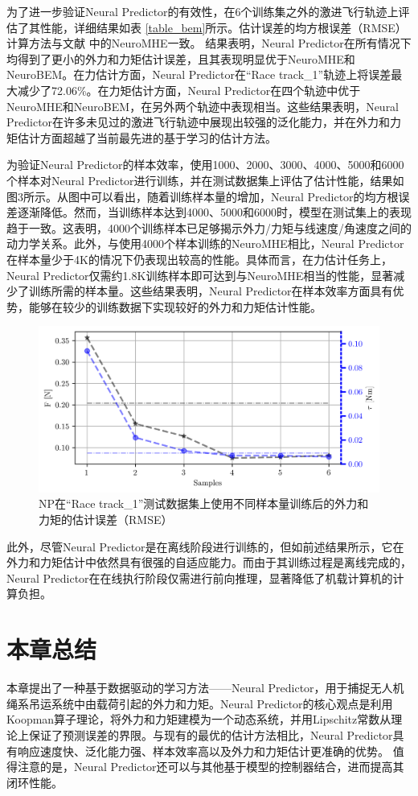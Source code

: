 \documentclass[lang=chs, degree=master, blindreview=true, winfonts=true]{yanputhesis}
\begin{document}
为了进一步验证Neural Predictor的有效性，在6个训练集之外的激进飞行轨迹上评估了其性能，详细结果如表 \ref{table_bem}所示。估计误差的均方根误差（RMSE）计算方法与文献 \cite{Wang2024e} 中的NeuroMHE一致。
结果表明，Neural Predictor在所有情况下均得到了更小的外力和力矩估计误差，且其表现明显优于NeuroMHE和NeuroBEM。在力估计方面，Neural Predictor在“Race track\_1”轨迹上将误差最大减少了72.06\%。在力矩估计方面，Neural Predictor在四个轨迹中优于NeuroMHE和NeuroBEM，在另外两个轨迹中表现相当。这些结果表明，Neural Predictor在许多未见过的激进飞行轨迹中展现出较强的泛化能力，并在外力和力矩估计方面超越了当前最先进的基于学习的估计方法。

为验证Neural Predictor的样本效率，使用1000、2000、3000、4000、5000和6000个样本对Neural Predictor进行训练，并在测试数据集上评估了估计性能，结果如图3所示。从图中可以看出，随着训练样本量的增加，Neural Predictor的均方根误差逐渐降低。然而，当训练样本达到4000、5000和6000时，模型在测试集上的表现趋于一致。这表明，4000个训练样本已足够揭示外力/力矩与线速度/角速度之间的动力学关系。此外，与使用4000个样本训练的NeuroMHE相比，Neural Predictor在样本量少于4K的情况下仍表现出较高的性能。具体而言，在力估计任务上，Neural Predictor仅需约1.8K训练样本即可达到与NeuroMHE相当的性能，显著减少了训练所需的样本量。这些结果表明，Neural Predictor在样本效率方面具有优势，能够在较少的训练数据下实现较好的外力和力矩估计性能。
\begin{figure}[hbt!]
	\centering
	\includegraphics[width=38pc]{picture/kk/sample_efficiency.png} 
	\caption{NP在“Race track\_1”测试数据集上使用不同样本量训练后的外力和力矩的估计误差（RMSE）} 
	\label{3-6}
\end{figure}
此外，尽管Neural Predictor是在离线阶段进行训练的，但如前述结果所示，它在外力和力矩估计中依然具有很强的自适应能力。而由于其训练过程是离线完成的，Neural Predictor在在线执行阶段仅需进行前向推理，显著降低了机载计算机的计算负担。

\section{本章总结}
本章提出了一种基于数据驱动的学习方法——Neural Predictor，用于捕捉无人机绳系吊运系统中由载荷引起的外力和力矩。Neural Predictor的核心观点是利用Koopman算子理论，将外力和力矩建模为一个动态系统，并用Lipschitz常数从理论上保证了预测误差的界限。与现有的最优的估计方法相比，Neural Predictor具有响应速度快、泛化能力强、样本效率高以及外力和力矩估计更准确的优势。 值得注意的是，Neural Predictor还可以与其他基于模型的控制器结合，进而提高其闭环性能。
\end{document}
